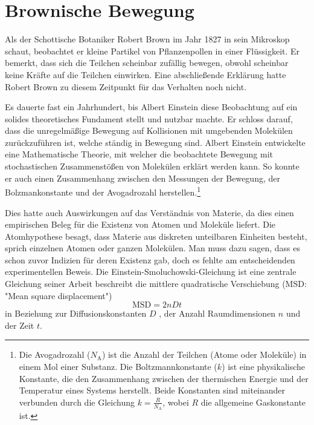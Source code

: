 %
%
%
%
\section{Brownische Bewegung\label{brown:BrownBewegung}}

Als der Schottische Botaniker Robert Brown im Jahr 1827 in sein Mikroskop schaut, beobachtet er kleine Partikel von Pflanzenpollen in einer Flüssigkeit. Er bemerkt, dass sich die Teilchen scheinbar zufällig bewegen, obwohl scheinbar keine Kräfte auf die Teilchen einwirken. Eine abschließende Erklärung hatte Robert Brown zu diesem Zeitpunkt für das Verhalten noch nicht.


Es dauerte fast ein Jahrhundert, bis Albert Einstein diese Beobachtung auf ein solides theoretisches Fundament stellt und nutzbar machte. Er schloss darauf, dass die unregelmäßige Bewegung auf Kollisionen mit umgebenden Molekülen zurückzuführen ist, welche ständig in Bewegung sind. Albert Einstein entwickelte eine Mathematische Theorie, mit welcher die beobachtete Bewegung mit stochastischen Zusammenstößen von Molekülen erklärt werden kann. So konnte er auch einen Zusammenhang zwischen den Messungen der Bewegung, der Bolzmankonstante und der  Avogadrozahl herstellen.\footnote{Die Avogadrozahl ($N_\mathrm{A}$) ist die Anzahl der Teilchen (Atome oder Moleküle) in einem Mol einer Substanz. Die Boltzmannkonstante ($k$) ist eine physikalische Konstante, die den Zusammenhang zwischen der thermischen Energie und der Temperatur eines Systems herstellt. Beide Konstanten sind miteinander verbunden durch die Gleichung $k = \frac{R}{N_\mathrm{A}}$, wobei $R$ die allgemeine Gaskonstante ist.}


Dies hatte auch Auswirkungen auf das Verständnis von Materie, da dies einen empirischen Beleg für die Existenz von Atomen und Moleküle liefert. Die Atomhypothese besagt, dass Materie aus diskreten unteilbaren Einheiten besteht, sprich einzelnen Atomen oder ganzen Molekülen. 
Man muss dazu sagen, dass es schon zuvor Indizien für deren Existenz gab, doch es fehlte am entscheidenden experimentellen Beweis.
Die Einstein-Smoluchowski-Gleichung ist eine zentrale Gleichung seiner Arbeit beschreibt die mittlere quadratische Verschiebung (MSD: "Mean square displacement")
\begin{equation}
	\mathrm{MSD} = 2nDt
\end{equation}
in Beziehung zur Diffusionskonstanten $ D $ , der Anzahl Raumdimensionen $ n $ und der Zeit $ t $.

